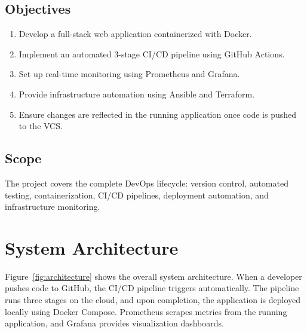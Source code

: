 \documentclass[12pt,a4paper]{article}
\begin{document}
\subsection{Objectives}
\begin{enumerate}
    \item Develop a full-stack web application containerized with Docker.
    \item Implement an automated 3-stage CI/CD pipeline using GitHub Actions.
    \item Set up real-time monitoring using Prometheus and Grafana.
    \item Provide infrastructure automation using Ansible and Terraform.
    \item Ensure changes are reflected in the running application once code is pushed to the VCS.
\end{enumerate}

\subsection{Scope}
The project covers the complete DevOps lifecycle: version control, automated testing, containerization, CI/CD pipelines, deployment automation, and infrastructure monitoring.

\section{System Architecture}

Figure~\ref{fig:architecture} shows the overall system architecture. When a developer pushes code to GitHub, the CI/CD pipeline triggers automatically. The pipeline runs three stages on the cloud, and upon completion, the application is deployed locally using Docker Compose. Prometheus scrapes metrics from the running application, and Grafana provides visualization dashboards.
\end{document}
